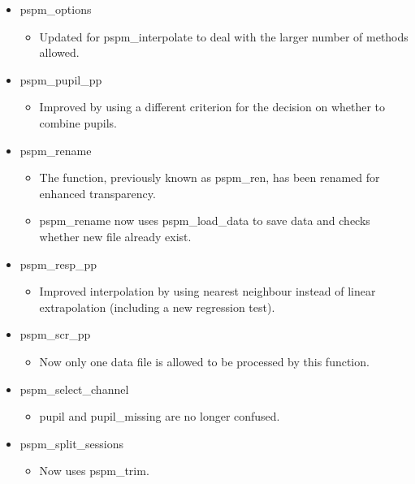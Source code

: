 \documentclass[english]{article}
\numberwithin{equation}{section}
\numberwithin{figure}{section}
\begin{document}
\begin{itemize}
\item pspm\_options

\begin{itemize}
\item Updated for pspm\_interpolate to deal with the larger number of methods allowed.
\end{itemize}

\item pspm\_pupil\_pp

\begin{itemize}
\item Improved by using a different criterion for the decision on whether to combine pupils.
\end{itemize}

\item pspm\_rename

\begin{itemize}
\item The function, previously known as pspm\_ren, has been renamed for enhanced transparency.

\item pspm\_rename now uses pspm\_load\_data to save data and checks whether new file already exist.
\end{itemize}

\item pspm\_resp\_pp

\begin{itemize}
\item Improved interpolation by using nearest neighbour instead of linear extrapolation (including a new regression test).
\end{itemize}

\item pspm\_scr\_pp

\begin{itemize}
\item Now only one data file is allowed to be processed by this function.
\end{itemize}

\item pspm\_select\_channel

\begin{itemize}
\item pupil and pupil\_missing are no longer confused.
\end{itemize}

\item pspm\_split\_sessions

\begin{itemize}
\item Now uses pspm\_trim.
\end{itemize}


\end{itemize}
\end{document}
